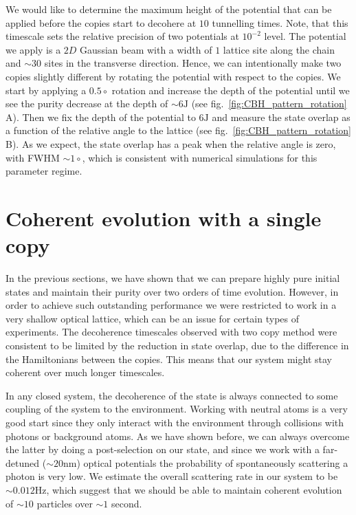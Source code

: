 We would like to determine the maximum height of the potential that can be applied before the copies start to decohere at $10$ tunnelling times. Note, that this timescale sets the relative precision of two potentials at $10^{-2}$ level. The potential we apply is a $2D$ Gaussian beam with a width of $1$ lattice site along the chain and $\sim 30$ sites in the transverse direction. Hence, we can intentionally make two copies slightly different by rotating the potential with respect to the copies. We start by applying a $0.5\circ$ rotation and increase the depth of the potential until we see the purity decrease at the depth of $\sim 6\mathrm{J}$ (see fig.~\ref{fig:CBH_pattern_rotation} A). Then we fix the depth of the potential to $6\mathrm{J}$ and measure the state overlap as a function of the relative angle to the lattice (see fig.~\ref{fig:CBH_pattern_rotation} B). As we expect, the state overlap has a peak when the relative angle is zero, with FWHM $\sim 1\circ$, which is consistent with numerical simulations for this parameter regime.

\section{Coherent evolution with a single copy}
In the previous sections, we have shown that we can prepare highly pure initial states and maintain their purity over two orders of time evolution. However, in order to achieve such outstanding performance we were restricted to work in a very shallow optical lattice, which can be an issue for certain types of experiments. The decoherence timescales observed with two copy method were consistent to be limited by the reduction in state overlap, due to the difference in the Hamiltonians between the copies. This means that our system might stay coherent over much longer timescales.

In any closed system, the decoherence of the state is always connected to some coupling of the system to the environment. Working with neutral atoms is a very good start since they only interact with the environment through collisions with photons or background atoms. As we have shown before, we can always overcome the latter by doing a post-selection on our state, and since we work with a far-detuned ($\sim 20 \mathrm{nm}$) optical potentials the probability of spontaneously scattering a photon is very low. We estimate the overall scattering rate in our system to be $\sim 0.012 \mathrm{Hz}$, which suggest that we should be able to maintain coherent evolution of $\sim 10$ particles over $\sim 1$ second.

